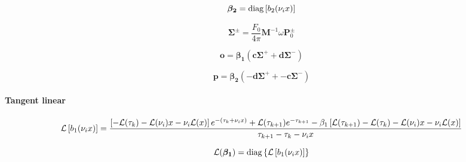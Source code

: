 \begin{equation}
\boldsymbol{\beta_{2}} = \mathrm{diag}\left[b_{2}(\nu_{i}x)\right]
\label{eq:mem-layer_quantities-particular_solution-forward-beta2}
\end{equation}

\begin{equation}
\mathbf{\Sigma}^{\pm} = \frac{F_{0}}{4 \pi} \mathbf{M}^{-1} \omega \mathbf{P}^{\pm}_{0}
\label{eq:mem-layer_quantities-particular_solution-forward-Sigma}
\end{equation}

\begin{equation}
\mathbf{o} = \boldsymbol{\beta_{1}}(\mathbf{c}\boldsymbol{\Sigma}^{+} + \mathbf{d}\boldsymbol{\Sigma}^{-})
\label{eq:mem-layer_quantities-particular_solution-forward-o}
\end{equation}

\begin{equation}
\mathbf{p} = \boldsymbol{\beta_{2}}(-\mathbf{d}\boldsymbol{\Sigma}^{+} + -\mathbf{c}\boldsymbol{\Sigma}^{-})
\label{eq:mem-layer_quantities-particular_solution-forward-p}
\end{equation}


%
\paragraph{Tangent linear}
\label{sec:mem-layer_quantities-particular_solution-tangent_linear}

\begin{adjustwidth}{-1in}{-1in}
\center
\begin{equation}
\mathcal{L}\left[b_{1}(\nu_{i}x)\right] = \frac{\left[-\mathcal{L}(\tau_{k}) - \mathcal{L}(\nu_{i})x - \nu_{i}\mathcal{L}(x)\right]e^{-(\tau_{k} + \nu_{i}x)} + \mathcal{L}(\tau_{k+1})e^{-\tau_{k+1}} - \beta_{1} \left[\mathcal{L}(\tau_{k+1}) - \mathcal{L}(\tau_{k}) - \mathcal{L}(\nu_{i})x - \nu_{i}\mathcal{L}(x)\right]}{\tau_{k+1} - \tau_{k} - \nu_{i}x}
\label{eq:mem-layer_quantities-particular_solution-tangent_linear-b1_l}
\end{equation}
\end{adjustwidth}

\begin{equation}
\mathcal{L}(\boldsymbol{\beta_{1}}) = \mathrm{diag}\left\{\mathcal{L}\left[b_{1}(\nu_{i}x)\right]\right\}
\label{eq:mem-layer_quantities-particular_solution-tangent_linear-lambda1_l}
\end{equation}

